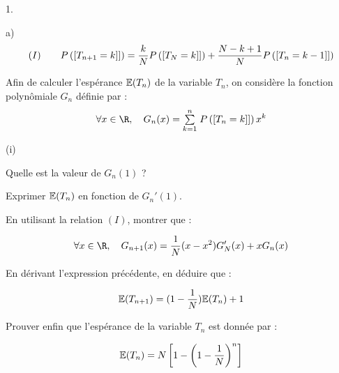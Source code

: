 \documentclass[11pt]{article}%
\begin{document}
\begin{noliste}{1.}
\begin{noliste}{a)}
\[
(I)\qquad P\left(\left[ {T_{n + 1} = k]} \right]\right) =
\dfrac{k}{N}P\left(\left[ {T_{N} = k]} \right]\right) + \dfrac{N-k +
1}{N}P\left(\left[ {T_{n} = k-1]} \right]\right)
\]
\item Afin de calculer l'espérance $\mathbb{E}(T_{n})$ de la variable $T_{n}$,
on considère la fonction polynômiale $G_{n}$ définie par :
\[
\forall x\in \R, \quad G_{n}(x) = \Sum{k = 1}{n} P\left(\Ev{T_{n} =
k]}\right)x^{k}
\]
 \begin{nonoliste}{(i)}
 \item Quelle est la valeur de $G_{n}(1)$ ?
 \item Exprimer $\mathbb{E}(T_{n})$ en fonction de $G_{n}'(1)$.
 \item En utilisant la relation $(I)$, montrer que :
 
\[
\forall x\in \R, \quad G_{n + 1}(x) = \dfrac{1}{N}(x-x^{2})G_{N}'(x) +
xG_{n}(x)
\]
 \item En dérivant l'expression précédente, en déduire que :
 
\[
\mathbb{E}(T_{n + 1}) = (1-\dfrac{1}{N})\mathbb{E}(T_{n}) + 1
\]
 \item Prouver enfin que l'espérance de la variable $T_{n}$ est donnée
par :
 
\[
\mathbb{E}(T_{n}) = N\left[1-\left(1-\dfrac{1}{N}\right)^{n} \right]
\]
\end{nonoliste}
\end{noliste}



\end{noliste}
\end{document}
